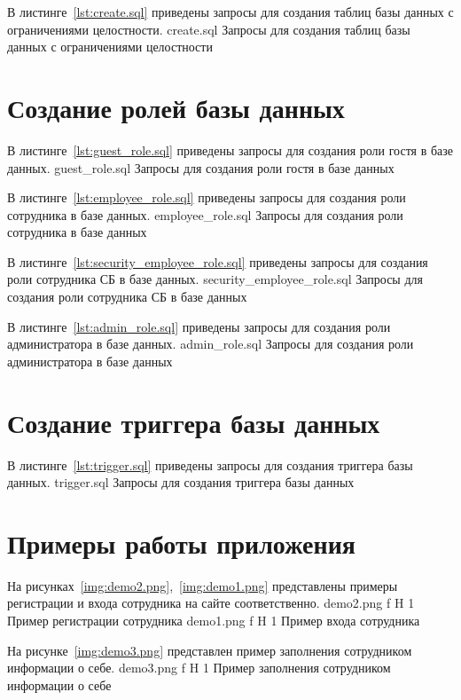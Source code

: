 В листинге~\ref{lst:create.sql} приведены запросы для создания таблиц базы данных с ограничениями целостности.
	{create.sql}
	{Запросы для создания таблиц базы данных с ограничениями целостности}
	
\clearpage

\section{Создание ролей базы данных}

В листинге~\ref{lst:guest_role.sql} приведены запросы для создания роли гостя в базе данных.
	{guest_role.sql}
	{Запросы для создания роли гостя в базе данных}

В листинге~\ref{lst:employee_role.sql} приведены запросы для создания роли сотрудника в базе данных.
	{employee_role.sql}
	{Запросы для создания роли сотрудника в базе данных}
	
В листинге~\ref{lst:security_employee_role.sql} приведены запросы для создания роли сотрудника СБ в базе данных.
	{security_employee_role.sql}
	{Запросы для создания роли сотрудника СБ в базе данных}
	
В листинге~\ref{lst:admin_role.sql} приведены запросы для создания роли администратора в базе данных.
	{admin_role.sql}
	{Запросы для создания роли администратора в базе данных}

\section{Создание триггера базы данных}

В листинге~\ref{lst:trigger.sql} приведены запросы для создания триггера базы данных.
	{trigger.sql}
	{Запросы для создания триггера базы данных}

\section{Примеры работы приложения}

На рисунках~\ref{img:demo2.png},~\ref{img:demo1.png} представлены примеры регистрации и входа сотрудника на сайте соответственно.
	{demo2.png}
	{f}
	{H}
	{1\textwidth}
	{Пример регистрации сотрудника}
	{demo1.png}
	{f}
	{H}
	{1\textwidth}
	{Пример входа сотрудника}

На рисунке~\ref{img:demo3.png} представлен пример заполнения сотрудником информации о себе.
	{demo3.png}
	{f}
	{H}
	{1\textwidth}
	{Пример заполнения сотрудником информации о себе}
	
